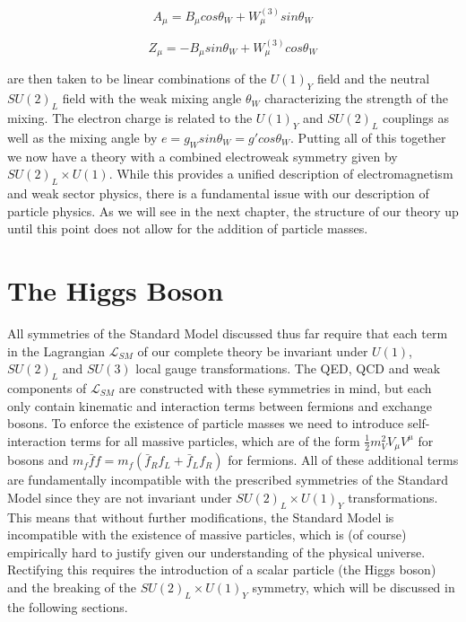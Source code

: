 \begin{equation}
A_{\mu} = B_{\mu}cos\theta_W + W^{(3)}_{\mu}sin\theta_W
\end{equation}

\begin{equation}
Z_{\mu} = -B_{\mu}sin\theta_W+W^{(3)}_{\mu}cos\theta_W
\end{equation}

are then taken to be linear combinations of the $U(1)_Y$ field and the neutral $SU(2)_L$ field with the weak mixing 
angle $\theta_W$ characterizing the strength of the mixing. The electron charge is related to the $U(1)_Y$ and 
$SU(2)_L$ couplings as well as the mixing angle by $e = g_Wsin\theta_W = g'cos\theta_W$. Putting all of this 
together we now have a theory with a combined electroweak symmetry given by $SU(2)_L \times U(1)$. While 
this provides a unified description of electromagnetism and weak sector physics, there is a fundamental issue with 
our description of particle physics. As we will see in the next chapter, the structure of our theory up until this point 
does not allow for the addition of particle masses.

\section{The Higgs Boson}

All symmetries of the Standard Model discussed thus far require that each term in the Lagrangian 
$\mathcal{L}_{SM}$ of our complete theory be invariant under $U(1)$, $SU(2)_L$ and $SU(3)$ local gauge 
transformations. The QED, QCD and weak components of $\mathcal{L}_{SM}$ are constructed with these symmetries 
in mind, but each only contain kinematic and interaction terms between fermions and exchange bosons. To enforce 
the existence of particle masses we need to introduce self-interaction terms for all massive particles, which are of the 
form $\frac{1}{2}m_V^2V_{\mu}V^{\mu}$ for bosons and $m_f\bar{f}f = m_f(\bar{f}_Rf_L + \bar{f}_Lf_R)$ for 
fermions. All of these additional terms are fundamentally incompatible with the prescribed symmetries of the Standard 
Model since they are not invariant under $SU(2)_L \times U(1)_Y$ transformations. This means that without further 
modifications, the Standard Model is incompatible with the existence of massive particles, which is (of course) 
empirically hard to justify given our understanding of the physical universe. Rectifying this requires the introduction of 
a scalar particle (the Higgs boson) and the breaking of the $SU(2)_L \times U(1)_Y$ symmetry, which will be 
discussed in the following sections.

